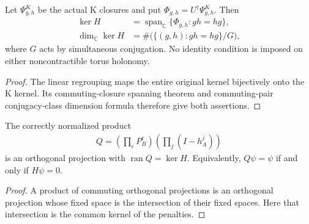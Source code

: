 \begin{theorem}
    \label{thm:peps_qd_original_sectors}
    \leanok
    Let $\Psi^K_{g,h}$ be the actual K closures and put
    $\Phi_{g,h}=U^\dagger\Psi^K_{g,h}$. Then
    \begin{align}
        \ker H&=\operatorname{span}_{\mathbb C}
          \{\Phi_{g,h}:gh=hg\},\\
        \dim_{\mathbb C}\ker H
          &=\#\bigl(\{(g,h):gh=hg\}/G\bigr),
    \end{align}
    where $G$ acts by simultaneous conjugation. No identity condition is imposed on either
    noncontractible torus holonomy.
\end{theorem}
\begin{proof}\leanok
    The linear regrouping maps the entire original kernel bijectively
    onto the K kernel. Its commuting-closure spanning theorem and
    commuting-pair conjugacy-class dimension formula therefore give
    both assertions.
\end{proof}

\begin{theorem}
    \label{thm:peps_qd_original_ground_projector}
    \leanok
    The correctly normalized product
    \begin{align}
        Q=\left(\prod_e P_B^e\right)\left(\prod_j(I-h_A^j)\right)
    \end{align}
    is an orthogonal projection with $\operatorname{ran}Q=\ker H$.
    Equivalently, $Q\psi=\psi$ if and only if $H\psi=0$.
\end{theorem}
\begin{proof}\leanok
    A product of commuting orthogonal projections is an orthogonal
    projection whose fixed space is the intersection of their fixed
    spaces. Here that intersection is the common kernel of the penalties.
\end{proof}

